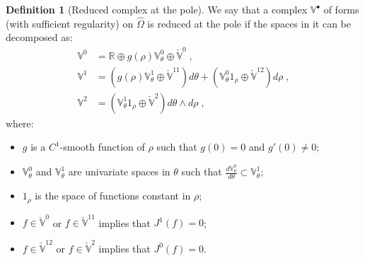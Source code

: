 \documentclass[10pt]{article}
\newcommand{\RR}{{\mathbb{R}}}
\newcommand{\vSpace}[1]{\mathbb{#1}}
\newcommand{\complex}[1]{\mathit{\vSpace{#1}^\bullet}}
\newcommand{\tpDomain}{\widehat{\Omega}}
\newcommand{\cU}{\theta}
\newcommand{\cV}{\rho}
\newcommand{\dcU}{\mathit{d\cU}}
\newcommand{\dcV}{\mathit{d\cV}}
\newcommand{\jet}[2]{J^{#1}\left(#2\right)}
\theoremstyle{plain}
\theoremstyle{definition}
\newtheorem{definition}{Definition}[section]
\theoremstyle{remark}
\begin{document}
\begin{definition}[Reduced complex at the pole]\label{def:reduced-complex}
    We say that a complex $\complex{V}$ of forms (with sufficient regularity) on $\tpDomain$ is reduced at the pole if the spaces in it can be decomposed as:
    \begin{equation}
        \begin{split}
            \vSpace{V}^0 &= \RR \oplus g(\cV)\vSpace{V}_\cU^0 \oplus \check{\vSpace{V}}^0\;,\\
            \vSpace{V}^1 &= \left(g(\cV)\vSpace{V}_\cU^1 \oplus \check{\vSpace{V}}^{11}\right)\dcU
                            + \left(\vSpace{V}_\cU^0 1_\cV \oplus \check{\vSpace{V}}^{12}\right)\dcV\;,\\
            \vSpace{V}^2 &= \left(\vSpace{V}_\cU^1 1_\cV \oplus \check{\vSpace{V}}^2\right)\dcU \wedge \dcV\;,
        \end{split}
    \end{equation}
    where:
    \begin{itemize}
        \item $g$ is a $C^1$-smooth function of $\cV$ such that $g(0) = 0$ and $g'(0) \neq 0$;
        \item $\vSpace{V}_\cU^0$ and $\vSpace{V}_\cU^1$ are univariate spaces in $\cU$ such that $\frac{d\vSpace{V}_\cU^0}{\dcU} \subset \vSpace{V}_\cU^1$;
        \item $1_\cV$ is the space of functions constant in $\cV$;
        \item $f \in \check{\vSpace{V}}^0$ or $f \in \check{\vSpace{V}}^{11}$ implies that $\jet{1}{f} = 0$;
        \item $f \in \check{\vSpace{V}}^{12}$ or $f \in \check{\vSpace{V}}^2$ implies that $\jet{0}{f} = 0$.
    \end{itemize}
\end{definition}
\end{document}
